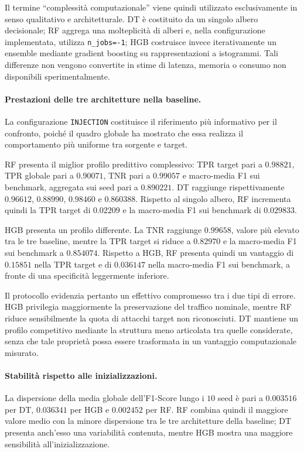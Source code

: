 Il termine ``complessità computazionale'' viene quindi utilizzato esclusivamente in senso qualitativo e architetturale. 
DT è costituito da un singolo albero decisionale; RF aggrega una molteplicità di alberi e, nella configurazione implementata, utilizza \texttt{n\_jobs=-1}; HGB costruisce invece iterativamente un ensemble mediante gradient boosting su rappresentazioni a istogrammi. 
Tali differenze non vengono convertite in stime di latenza, memoria o consumo non disponibili sperimentalmente.

\paragraph{Prestazioni delle tre architetture nella baseline.}
La configurazione \texttt{INJECTION} costituisce il riferimento più informativo per il confronto, poiché il quadro globale ha mostrato che essa realizza il comportamento più uniforme tra sorgente e target.

RF presenta il miglior profilo predittivo complessivo: TPR target pari a $0.98821$, TPR globale pari a $0.90071$, TNR pari a $0.99057$ e macro-media F1 sui benchmark, aggregata sui seed pari a $0.890221$. 
DT raggiunge rispettivamente $0.96612$, $0.88990$, $0.98460$ e $0.860388$. 
Rispetto al singolo albero, RF incrementa quindi la TPR target di $0.02209$ e la macro-media F1 sui benchmark di $0.029833$.

HGB presenta un profilo differente. 
La TNR raggiunge $0.99658$, valore più elevato tra le tre baseline, mentre la TPR target si riduce a $0.82970$ e la macro-media F1 sui benchmark a $0.854074$. 
Rispetto a HGB, RF presenta quindi un vantaggio di $0.15851$ nella TPR target e di $0.036147$ nella macro-media F1 sui benchmark, a fronte di una specificità leggermente inferiore.

Il protocollo evidenzia pertanto un effettivo compromesso tra i due tipi di errore. 
HGB privilegia maggiormente la preservazione del traffico nominale, mentre RF riduce sensibilmente la quota di attacchi target non riconosciuti.
DT mantiene un profilo competitivo mediante la struttura meno articolata tra quelle considerate, senza che tale proprietà possa essere trasformata in un vantaggio computazionale misurato.

\paragraph{Stabilità rispetto alle inizializzazioni.}
La dispersione della media globale dell'F1-Score lungo i $10$ seed è pari a $0.003516$ per DT, $0.036341$ per HGB e $0.002452$ per RF. 
RF combina quindi il maggiore valore medio con la minore dispersione tra le tre architetture della baseline; DT presenta anch'esso una variabilità contenuta, mentre HGB mostra una maggiore sensibilità all'inizializzazione.

